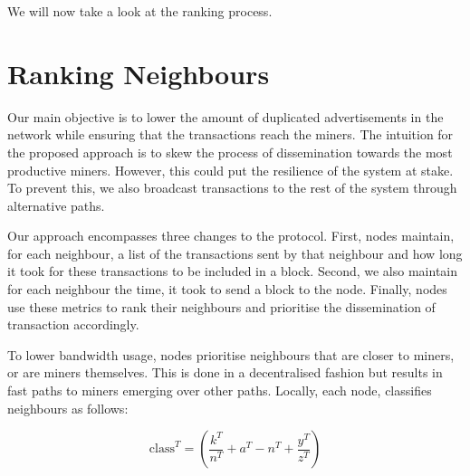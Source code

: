 We will now take a look at the ranking process.

\section{Ranking Neighbours}
\label{sec:ranking}
Our main objective is to lower the amount of duplicated advertisements in the network while ensuring that the transactions reach the miners. The intuition for the proposed approach is to skew the process of dissemination towards the most productive miners. However, this could put the resilience of the system at stake. To prevent this, we also broadcast transactions to the rest of the system through alternative paths.

Our approach encompasses three changes to the protocol.
First, nodes  maintain, for each neighbour, a list of the transactions sent by that neighbour and how long it took for these transactions to be included in a block.
Second, we also maintain for each neighbour the time, it took to send a block to the node.
Finally, nodes use these metrics to rank their neighbours and prioritise the dissemination of transaction accordingly.

To lower bandwidth usage, nodes prioritise neighbours that are closer to miners, or are miners themselves.
This is done in a decentralised fashion but results in fast paths to miners emerging over other paths.
Locally, each node, classifies neighbours as follows:

\begin{displaymath} \mbox{class}^{T}= (\dfrac{k^{T}}{n^{T}} + a^{T} - n^{T} + \dfrac{y^{T}}{z^{T}}) \end{displaymath}



